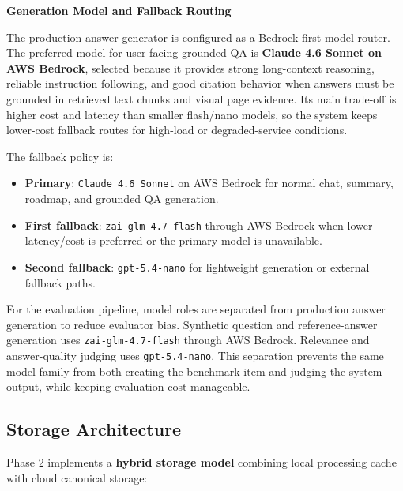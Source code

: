 \textbf{Generation Model and Fallback Routing}

The production answer generator is configured as a Bedrock-first model router. The preferred model for user-facing grounded QA is \textbf{Claude 4.6 Sonnet on AWS Bedrock}, selected because it provides strong long-context reasoning, reliable instruction following, and good citation behavior when answers must be grounded in retrieved text chunks and visual page evidence. Its main trade-off is higher cost and latency than smaller flash/nano models, so the system keeps lower-cost fallback routes for high-load or degraded-service conditions.

The fallback policy is:
\begin{itemize}
    \item \textbf{Primary}: \texttt{Claude 4.6 Sonnet} on AWS Bedrock for normal chat, summary, roadmap, and grounded QA generation.
    \item \textbf{First fallback}: \texttt{zai-glm-4.7-flash} through AWS Bedrock when lower latency/cost is preferred or the primary model is unavailable.
    \item \textbf{Second fallback}: \texttt{gpt-5.4-nano} for lightweight generation or external fallback paths.
\end{itemize}

For the evaluation pipeline, model roles are separated from production answer generation to reduce evaluator bias. Synthetic question and reference-answer generation uses \texttt{zai-glm-4.7-flash} through AWS Bedrock. Relevance and answer-quality judging uses \texttt{gpt-5.4-nano}. This separation prevents the same model family from both creating the benchmark item and judging the system output, while keeping evaluation cost manageable.


\subsection{Storage Architecture}

Phase 2 implements a \textbf{hybrid storage model} combining local processing cache with cloud canonical storage:

